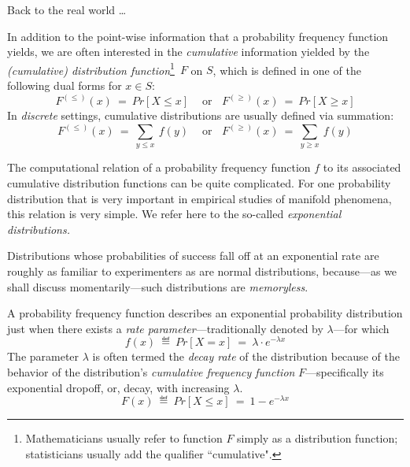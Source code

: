 \noindent Back to the real world \ldots

\bigskip

 

In addition to the point-wise information that a probability frequency function yields, we are
often interested in the {\em cumulative} information yielded by the 
{\it (cumulative) distribution function}\footnote{Mathematicians usually refer to function $F$
simply as a distribution function; statisticians usually add the qualifier ``cumulative".}~$F$ 
on $S$, which is defined in one of the following dual forms for $x \in S$:
\[ F^{(\leq)}(x) \ = \ Pr[X \leq x] \ \ \ \ \mbox{ or} \ \ \ \  F^{(\geq)}(x) \ = \ Pr[X \geq x]\]
In {\em discrete} settings, cumulative distributions are usually defined via summation:
\[ F^{(\leq)}(x) \ = \ \sum_{y \leq x} \ f(y)  \ \ \ \ \mbox{ or} \ \ \ \ F^{(\geq)}(x) \ = \ \sum_{y \geq x} \ f(y) \]


The computational relation of a probability frequency function $f$ to its associated cumulative distribution functions can be quite complicated.  For one probability distribution that is very important in empirical studies of manifold phenomena, this relation is very simple.  We refer here to the so-called {\em exponential distributions.}

\bigskip


Distributions whose probabilities of success fall off at an exponential rate are roughly as familiar to experimenters as are normal distributions, because---as we shall discuss momentarily---such distributions are {\em memoryless}.

A probability frequency function describes an exponential probability distribution just when there exists a {\em rate parameter}---traditionally denoted by $\lambda$---for which
\[ f(x) \ \eqdef \ Pr[X=x] \ = \ \lambda \cdot e^{-\lambda x} \]
The parameter $\lambda$ is often termed the {\em decay rate} of the distribution because of the behavior of the distribution's {\em cumulative frequency function} $F$---specifically its exponential dropoff, or, decay, with increasing $\lambda$.
\[ F(x) \ \eqdef \ Pr[X \leq x] \ = \ 1 - e^{-\lambda x} \]

